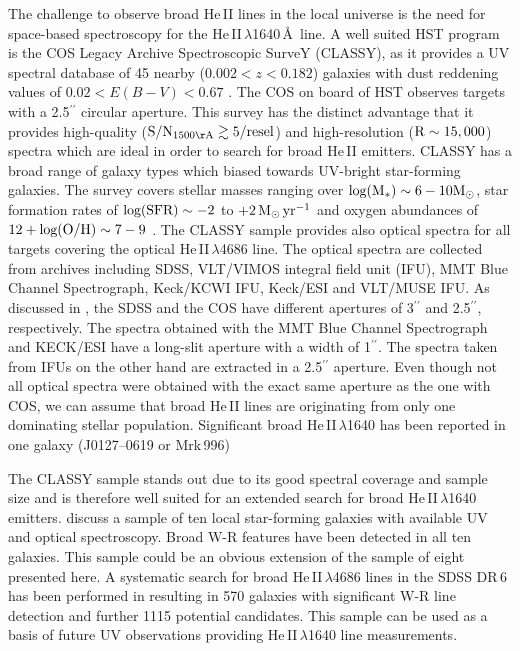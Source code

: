 \documentclass[]{aastex63}
\begin{document}
The challenge to observe broad He\,II lines in the local universe is the need for space-based spectroscopy for the He\,II\,$\lambda$1640\,\AA\ line. 
A well suited HST program is the COS Legacy Archive Spectroscopic SurveY (CLASSY), as it provides a UV spectral database of 45 nearby ($0.002 < z < 0.182$) galaxies with dust reddening values of $0.02 < E(B-V) < 0.67$ \citep{berg_cos_2022}. The COS on board of HST observes targets with a 2.5$^{\prime\prime}$ circular aperture. 
This survey has the distinct advantage that it provides high-quality (${\rm S/N_{\rm 1500\AA} \gtrsim 5/resel}$) and high-resolution (${\rm R\sim15,000}$) \citep{james_classy_2022} spectra which are ideal in order to search for broad He\,II emitters. 
CLASSY has a broad range of galaxy types which biased towards UV-bright star-forming galaxies. The survey covers stellar masses ranging over ${\rm log(M_*) \sim 6-10 M_{\odot}}$, star formation rates of ${\rm log(SFR) \sim-2}$ to ${\rm +2\,M_{\odot}\,yr^{-1}}$ and oxygen abundances of ${\rm 12+log(O/H) \sim 7-9}$ \citep{berg_cos_2022}.
The CLASSY sample provides also optical spectra for all targets covering the optical He\,II\,$\lambda$4686 line. The optical spectra are collected from archives including SDSS, VLT/VIMOS integral field unit (IFU), MMT Blue Channel Spectrograph, Keck/KCWI IFU, Keck/ESI and VLT/MUSE IFU. As discussed in \citet{arellano-cordova_classy_2022}, the SDSS and the COS have different apertures of 3$^{\prime\prime}$ and 2.5$^{\prime\prime}$, respectively. The spectra obtained with the MMT Blue Channel Spectrograph and KECK/ESI have a long-slit aperture with a width of 1$^{\prime\prime}$.
The spectra taken from IFUs on the other hand are extracted in a 2.5$^{\prime\prime}$ aperture.
Even though not all optical spectra were obtained with the exact same aperture as the one with COS, we can assume that broad He\,II lines are originating from only one dominating stellar population. Significant broad He\,II\,$\lambda$1640 has been reported in one galaxy (J0127--0619 or Mrk\,996)

The CLASSY sample stands out due to its good spectral coverage and sample size and is therefore well suited for an extended search for broad He\,II\,$\lambda$1640 emitters. \citet{senchyna_ultraviolet_2021} discuss a sample of ten local star-forming galaxies with available UV and optical spectroscopy. Broad W-R features have been detected in all ten galaxies. This sample could be an obvious extension of the sample of eight presented here.  
A systematic search for broad He\,II\,$\lambda$4686 lines in the SDSS DR\,6 has been performed in \citet{brinchmann_galaxies_2008} resulting in 570 galaxies with significant W-R line detection and further 1115 potential candidates. This sample can be used as a basis of future UV observations providing He\,II\,$\lambda$1640 line measurements.
\end{document}
